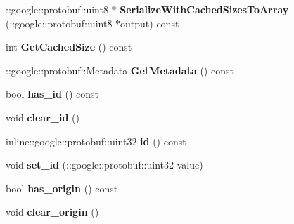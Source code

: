 \begin{DoxyCompactItemize}
\item 
\+::google\+::protobuf\+::uint8 $\ast$ {\bfseries Serialize\+With\+Cached\+Sizes\+To\+Array} (\+::google\+::protobuf\+::uint8 $\ast$output) const \hypertarget{classvss__state_1_1Global__State_a55efb24ef78b4e7eff557a1c7fd5d7e4}{}\label{classvss__state_1_1Global__State_a55efb24ef78b4e7eff557a1c7fd5d7e4}

\item 
int {\bfseries Get\+Cached\+Size} () const \hypertarget{classvss__state_1_1Global__State_aa94066556db76353540b8b54d77eed2e}{}\label{classvss__state_1_1Global__State_aa94066556db76353540b8b54d77eed2e}

\item 
\+::google\+::protobuf\+::\+Metadata {\bfseries Get\+Metadata} () const \hypertarget{classvss__state_1_1Global__State_a3b2d5b30093df0eb8b20f991dc2d8d9e}{}\label{classvss__state_1_1Global__State_a3b2d5b30093df0eb8b20f991dc2d8d9e}

\item 
bool {\bfseries has\+\_\+id} () const \hypertarget{classvss__state_1_1Global__State_a7d7595f10e8923fada79b67c77ba7cd3}{}\label{classvss__state_1_1Global__State_a7d7595f10e8923fada79b67c77ba7cd3}

\item 
void {\bfseries clear\+\_\+id} ()\hypertarget{classvss__state_1_1Global__State_a0b001773d7aafdb5acef5b36c35f7075}{}\label{classvss__state_1_1Global__State_a0b001773d7aafdb5acef5b36c35f7075}

\item 
inline\+::google\+::protobuf\+::uint32 {\bfseries id} () const \hypertarget{classvss__state_1_1Global__State_ab0ff3c2867cdfda57429a649c9abde17}{}\label{classvss__state_1_1Global__State_ab0ff3c2867cdfda57429a649c9abde17}

\item 
void {\bfseries set\+\_\+id} (\+::google\+::protobuf\+::uint32 value)\hypertarget{classvss__state_1_1Global__State_a183935ca3daee149b526d4a50cce450e}{}\label{classvss__state_1_1Global__State_a183935ca3daee149b526d4a50cce450e}

\item 
bool {\bfseries has\+\_\+origin} () const \hypertarget{classvss__state_1_1Global__State_ab80313b62ce603f182c3e2e1fbea8da5}{}\label{classvss__state_1_1Global__State_ab80313b62ce603f182c3e2e1fbea8da5}

\item 
void {\bfseries clear\+\_\+origin} ()\hypertarget{classvss__state_1_1Global__State_a60aa49b36faa6533ed70bc9e01208282}{}\label{classvss__state_1_1Global__State_a60aa49b36faa6533ed70bc9e01208282}


\end{DoxyCompactItemize}

